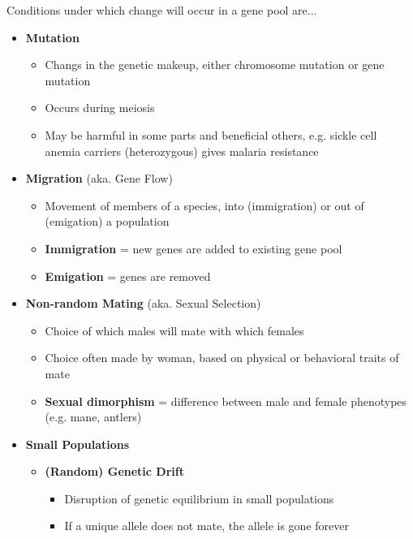 \documentclass[a4paper,12pt]{article}
\begin{document}
Conditions under which change will occur in a gene pool are...
\begin{itemize}
    \item{
            \textbf{Mutation}
            \begin{itemize}
                \item{Changs in the genetic makeup, either chromosome mutation or gene mutation}
                \item{Occurs during meiosis}
                \item{May be harmful in some parts and beneficial others, e.g. sickle cell anemia carriers (heterozygous) gives malaria resistance}
            \end{itemize}
        }

    \item{
            \textbf{Migration} (aka. Gene Flow)
            \begin{itemize}
                \item{Movement of members of a species, into (immigration) or out of (emigation) a population}
                \item{\textbf{Immigration} = new genes are added to existing gene pool}
                \item{\textbf{Emigation} = genes are removed}
            \end{itemize}
        }
    \item{
            \textbf{Non-random Mating} (aka. Sexual Selection)
            \begin{itemize}
                \item{Choice of which males will mate with which females}
                \item{Choice often made by woman, based on physical or behavioral traits of mate}
                \item{\textbf{Sexual dimorphism} = difference between male and female phenotypes (e.g. mane, antlers)}
            \end{itemize}
        }
    \item{
            \textbf{Small Populations}
            \begin{itemize}
                \item{
                        \textbf{(Random) Genetic Drift}
                        \begin{itemize}
                            \item{Disruption of genetic equilibrium in small populations}
                            \item{If a unique allele does not mate, the allele is gone forever}

\end{itemize}}
\end{itemize}}
\end{itemize}
\end{document}

